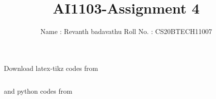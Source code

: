 \documentclass[journal,12pt,twocolumn]{IEEEtran}
\DeclareMathOperator*{\Res}{Res}
\begin{document}
\newcommand{\BEQA}{\begin{eqnarray}}
\newcommand{\EEQA}{\end{eqnarray}}
\newcommand{\define}{\stackrel{\triangle}{=}}

\raggedbottom
\setlength{\parindent}{0pt}
\providecommand{\mbf}{\mathbf}
\providecommand{\pr}[1]{\ensuremath{\Pr\left(#1\right)}}
\providecommand{\qfunc}[1]{\ensuremath{Q\left(#1\right)}}
\providecommand{\sbrak}[1]{\ensuremath{{}\left[#1\right]}}
\providecommand{\lsbrak}[1]{\ensuremath{{}\left[#1\right.}}
\providecommand{\rsbrak}[1]{\ensuremath{{}\left.#1\right]}}
\providecommand{\brak}[1]{\ensuremath{\left(#1\right)}}
\providecommand{\lbrak}[1]{\ensuremath{\left(#1\right.}}
\providecommand{\rbrak}[1]{\ensuremath{\left.#1\right)}}
\providecommand{\cbrak}[1]{\ensuremath{\left\{#1\right\}}}
\providecommand{\lcbrak}[1]{\ensuremath{\left\{#1\right.}}
\providecommand{\rcbrak}[1]{\ensuremath{\left.#1\right\}}}
\providecommand{\prlbrak}[1]{\ensuremath{\Pr\left(#1\right.}}
\theoremstyle{remark}
\newtheorem{rem}{Remark}
\newcommand{\sgn}{\mathop{\mathrm{sgn}}}
\providecommand{\abs}[1]{\vert#1\vert}
\providecommand{\res}[1]{\Res\displaylimits_{#1}} 
\providecommand{\norm}[1]{\lVert#1\rVert}
\providecommand{\mtx}[1]{\mathbf{#1}}
\providecommand{\mean}[1]{E[ #1 ]}
\providecommand{\fourier}{\overset{\mathcal{F}}{ \rightleftharpoons}}
\providecommand{\system}{\overset{\mathcal{H}}{ \longleftrightarrow}}
\newcommand{\solution}{\noindent \textbf{Solution: }}
\newcommand{\cosec}{\,\text{cosec}\,}
\providecommand{\dec}[2]{\ensuremath{\overset{#1}{\underset{#2}{\gtrless}}}}
\newcommand{\myvec}[1]{\ensuremath{\begin{pmatrix}#1\end{pmatrix}}}
\newcommand{\mydet}[1]{\ensuremath{\begin{vmatrix}#1\end{vmatrix}}}
\makeatletter
{}
\makeatother
\let\StandardTheFigure\thefigure
\let\vec\mathbf
\renewcommand{\thefigure}{\theproblem}
\def\putbox#1#2#3{\makebox[0in][l]{\makebox[#1][l]{}\raisebox{\baselineskip}[0in][0in]{\raisebox{#2}[0in][0in]{#3}}}}
     \def\rightbox#1{\makebox[0in][r]{#1}}
     \def\centbox#1{\makebox[0in]{#1}}
     \def\topbox#1{\raisebox{-\baselineskip}[0in][0in]{#1}}
     \def\midbox#1{\raisebox{-0.5\baselineskip}[0in][0in]{#1}}
\vspace{3cm}
\title{AI1103-Assignment 4}
\author{Name : Revanth badavathu    Roll No. : CS20BTECH11007}
\maketitle
\newpage
\bigskip
\renewcommand{\thefigure}{\theenumi}
\renewcommand{\thetable}{\theenumi}
Download latex-tikz codes from 
%
\begin{lstlisting}

\end{lstlisting}
and python codes from 
\begin{lstlisting}

\end{lstlisting}
\end{document}
